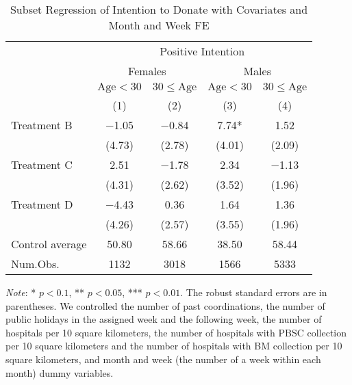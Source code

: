 \documentclass[12pt, a4paper]{article}
\begin{document}
\begin{table}[H]

\caption{\label{tab:int-lm-subset2}Subset Regression of Intention to Donate with Covariates and Month and Week FE}
\centering
\fontsize{8}{10}\selectfont
\begin{threeparttable}
\begin{tabular}[t]{lcccc}
\toprule
\multicolumn{1}{c}{ } & \multicolumn{4}{c}{Positive Intention} \\
\cmidrule(l{3pt}r{3pt}){2-5}
\multicolumn{1}{c}{ } & \multicolumn{2}{c}{Females} & \multicolumn{2}{c}{Males} \\
\cmidrule(l{3pt}r{3pt}){2-3} \cmidrule(l{3pt}r{3pt}){4-5}
\multicolumn{1}{c}{ } & \multicolumn{1}{c}{$\text{Age} < 30$} & \multicolumn{1}{c}{$30 \le \text{Age}$} & \multicolumn{1}{c}{$\text{Age} < 30$} & \multicolumn{1}{c}{$30 \le \text{Age}$} \\
\cmidrule(l{3pt}r{3pt}){2-2} \cmidrule(l{3pt}r{3pt}){3-3} \cmidrule(l{3pt}r{3pt}){4-4} \cmidrule(l{3pt}r{3pt}){5-5}
  & (1) & (2) & (3) & (4)\\
\midrule
Treatment B & \num{-1.05} & \num{-0.84} & \num{7.74}* & \num{1.52}\\
 & (\num{4.73}) & (\num{2.78}) & (\num{4.01}) & (\num{2.09})\\
Treatment C & \num{2.51} & \num{-1.78} & \num{2.34} & \num{-1.13}\\
 & (\num{4.31}) & (\num{2.62}) & (\num{3.52}) & (\num{1.96})\\
Treatment D & \num{-4.43} & \num{0.36} & \num{1.64} & \num{1.36}\\
 & (\num{4.26}) & (\num{2.57}) & (\num{3.55}) & (\num{1.96})\\
\midrule
Control average & 50.80 & 58.66 & 38.50 & 58.44\\
Num.Obs. & \num{1132} & \num{3018} & \num{1566} & \num{5333}\\
\bottomrule
\end{tabular}
\begin{tablenotes}
\item \emph{Note}: * $p < 0.1$, ** $p < 0.05$, *** $p < 0.01$. The robust standard errors are in parentheses. We controlled the number of past coordinations, the number of public holidays in the assigned week and the following week, the number of hospitals per 10 square kilometers, the number of hospitals with PBSC collection per 10 square kilometers and the number of hospitals with BM collection per 10 square kilometers, and month and week (the number of a week within each month) dummy variables.
\end{tablenotes}
\end{threeparttable}
\end{table}
\end{document}
